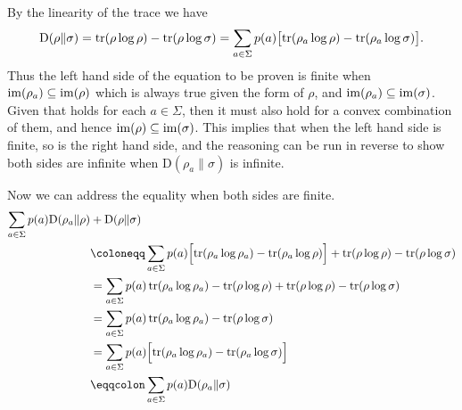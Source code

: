 \documentclass[boxes,pages,color=SeaGreen]{homework}
\newcommand{\relEn}{\mathrm{D}}
\begin{document}
\begin{solution}
    By the linearity of the trace we have
    \begin{align*}
        \relEn(\rho \| \sigma) = \tr(\rho\log\rho) - \tr(\rho\log\sigma) = \sum_{a\in\Sigma}p(a)\qty\big[\tr(\rho_a\log\rho) - \tr(\rho_a\log\sigma)].
    \end{align*} %
    Thus the left hand side of the equation to be proven is finite when $\operatorname{im}(\rho_a) \subseteq \operatorname{im}(\rho)$ which is always true given the form of $\rho$, and $\operatorname{im}(\rho_a) \subseteq \operatorname{im}(\sigma)$. Given that holds for each $a \in \Sigma$, then it must also hold for a convex combination of them, and hence $\operatorname{im}(\rho) \subseteq \operatorname{im}(\sigma)$.
    This implies that when the left hand side is finite, so is the right hand side, and the reasoning can be run in reverse to show both sides are infinite when $\mathrm{D}(\rho_a \| \sigma)$ is infinite.

    Now we can address the equality when both sides are finite.
    \begin{align*}
        \sum_{a\in\Sigma} p(a) \mathrm{D}(\rho_a \| \rho) & + \mathrm{D}(\rho \| \sigma)                                                                                                  \\
                                                          & \defeq \sum_{a\in\Sigma} p(a) \qty\Big[\tr(\rho_a\log\rho_a) - \tr(\rho_a\log\rho)] + \tr(\rho\log\rho) - \tr(\rho\log\sigma) \\
                                                          & = \sum_{a\in\Sigma} p(a) \tr(\rho_a\log\rho_a) - \tr(\rho\log\rho) + \tr(\rho\log\rho) - \tr(\rho\log\sigma)                  \\
                                                          & = \sum_{a\in\Sigma} p(a) \tr(\rho_a\log\rho_a) - \tr(\rho\log\sigma)                                                          \\
                                                          & = \sum_{a\in\Sigma} p(a) \qty\Big[\tr(\rho_a\log\rho_a) - \tr(\rho_a\log\sigma)]                                              \\
                                                          & \eqdef \sum_{a\in\Sigma} p(a) \mathrm{D}(\rho_a \| \sigma)
    \end{align*}

\end{solution}

\end{document}
